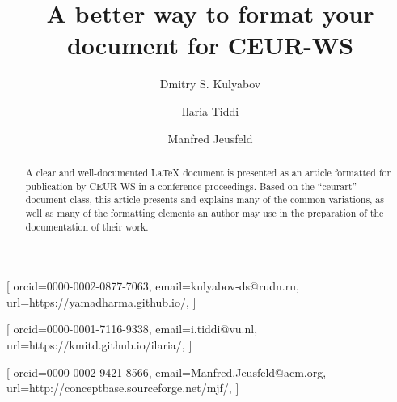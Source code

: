 \documentclass[
 twocolumn,
 hf,
]{ceurart}
\begin{document}


\title{A better way to format your document for CEUR-WS}

\tnotemark[1]

\author[1,2]{Dmitry S. Kulyabov}[%
orcid=0000-0002-0877-7063,
email=kulyabov-ds@rudn.ru,
url=https://yamadharma.github.io/,
]
\cormark[1]
\fnmark[1]
\address[1]{Peoples' Friendship University of Russia (RUDN University),
  6 Miklukho-Maklaya St, Moscow, 117198, Russian Federation}
\address[2]{Joint Institute for Nuclear Research,
  6 Joliot-Curie, Dubna, Moscow region, 141980, Russian Federation}

\author[3]{Ilaria Tiddi}[%
orcid=0000-0001-7116-9338,
email=i.tiddi@vu.nl,
url=https://kmitd.github.io/ilaria/,
]
\fnmark[1]
\address[3]{Vrije Universiteit Amsterdam, De Boelelaan 1105, 1081 HV Amsterdam, The Netherlands}

\author[4]{Manfred Jeusfeld}[%
orcid=0000-0002-9421-8566,
email=Manfred.Jeusfeld@acm.org,
url=http://conceptbase.sourceforge.net/mjf/,
]
\fnmark[1]
\address[4]{University of Skövde, Högskolevägen 1, 541 28 Skövde, Sweden}


\begin{abstract}
  A clear and well-documented \LaTeX{} document is presented as an
  article formatted for publication by CEUR-WS in a conference
  proceedings. Based on the ``ceurart'' document class, this article
  presents and explains many of the common variations, as well as many
  of the formatting elements an author may use in the preparation of
  the documentation of their work.
\end{abstract}
\end{document}
